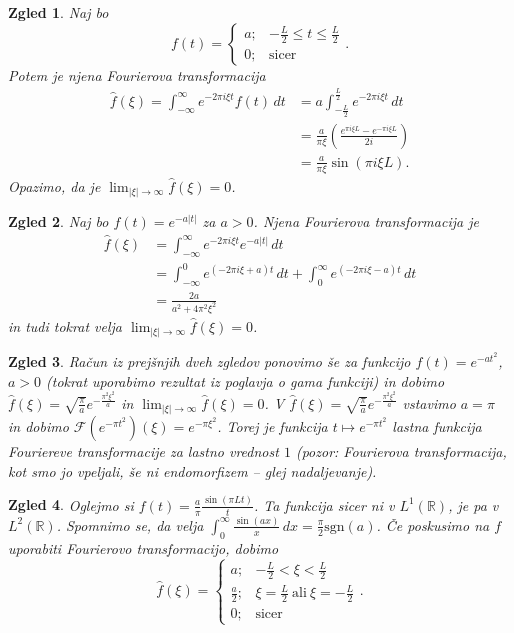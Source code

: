 \documentclass[10pt, a4paper]{article}
\newtheorem{zgled}{Zgled}[section]
\newcommand{\R}{\mathbb {R}}
\newcommand{\F}{\mathcal{F}}
\begin{document}
\begin{zgled}
    Naj bo $$f(t) = \begin{cases}
        a; & -\frac{L}{2} \leq t \leq \frac{L}{2}\\
        0; & \mathrm{sicer}
    \end{cases}.$$
    Potem je njena Fourierova transformacija 
    \begin{align*}
        \hat{f} (\xi) = \int_{-\infty} ^\infty e^{-2 \pi i \xi t} f(t)\, dt &= a \int_{-\frac{L}{2}} ^\frac{L}{2} e^{-2\pi i \xi t}\, dt\\
        &= \frac{a}{\pi \xi} \left(\frac{e^{\pi i \xi L} - e^{-\pi i \xi L}}{2i}\right)\\
        &= \frac{a}{\pi \xi} \sin (\pi i \xi L).
    \end{align*}
    Opazimo, da je $\lim_{|\xi| \to \infty} \hat{f} (\xi) = 0$.
\end{zgled}

\begin{zgled}
    Naj bo $f(t) = e^{-a|t|}$ za $a > 0$. Njena Fourierova transformacija je
    \begin{align*}
        \hat{f} (\xi) &= \int_{-\infty} ^\infty e^{-2 \pi i \xi t} e^{-a|t|}\, dt\\
        &= \int_{-\infty} ^0 e^{(-2 \pi i \xi + a)t}\,dt + \int_0 ^\infty e^{(-2 \pi i \xi - a)t}\, dt\\
        &= \frac{2a}{a^2 + 4\pi^2 \xi^2}
    \end{align*}
    in tudi tokrat velja $\lim_{|\xi| \to \infty} \hat{f} (\xi) = 0$.
\end{zgled}

\begin{zgled}
    Račun iz prejšnjih dveh zgledov ponovimo še za funkcijo $f(t) = e^{-at^2}$, $a > 0$ (tokrat uporabimo rezultat iz poglavja o gama funkciji)
    in dobimo $\hat{f}(\xi) = \sqrt{\frac{\pi}{a}} e^{-\frac{\pi^2 \xi^2}{a}}$
    in $\lim_{|\xi| \to \infty} \hat{f} (\xi) = 0$.
    V $\hat{f} (\xi)= \sqrt{\frac{\pi}{a}} e^{-\frac{\pi^2 \xi^2}{a}}$ vstavimo $a = \pi$ in dobimo 
    $\F (e^{-\pi t^2}) (\xi) = e^{-\pi \xi^2}$.
    Torej je funkcija $t \mapsto e^{-\pi t^2}$ lastna funkcija Fouriereve transformacije za lastno vrednost $1$ (pozor: Fourierova transformacija, kot smo jo vpeljali, še ni endomorfizem -- glej nadaljevanje).
\end{zgled}

\begin{zgled}
    Oglejmo si $f(t) = \frac{a}{\pi} \frac{\sin (\pi L t)}{t}$. Ta funkcija sicer ni v $L^1 (\R)$,
    je pa v $L^2 (\R)$. Spomnimo se, da velja $\int_0 ^\infty \frac{\sin (ax)}{x}\, dx = \frac{\pi}{2} \mathrm{sgn}(a)$.
    Če poskusimo na $f$ uporabiti Fourierovo transformacijo, dobimo 
    $$\hat{f} (\xi) = \begin{cases}
        a ; & -\frac{L}{2} < \xi < \frac{L}{2}\\
        \frac{a}{2} ; & \xi = \frac{L}{2}\ \mathrm{ali}\ \xi = - \frac{L}{2}\\
        0 ; & \mathrm{sicer}
    \end{cases}.$$
\end{zgled}
\end{document}
